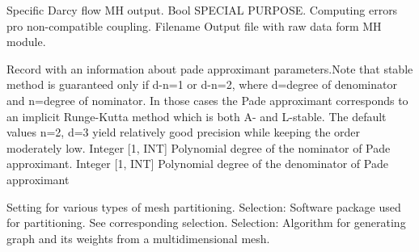 \begin{RecordType}
	{}
	{} %
	{} %
	{} %
	{{{Specific Darcy flow MH output.}}}
		\KeyItem
			{}
			{{Bool}}
			{\textrangle}
			{} %
			{{{SPECIAL PURPOSE. Computing errors pro non-compatible coupling.}}}
		\KeyItem
			{}
			{{Filename}}
			{\textrangle}
			{} %
			{{{Output file with raw data form MH module.}}}
\end{RecordType}
\begin{RecordType}
	{}
	{} %
	{} %
	{} %
	{{{Record with an information about pade approximant parameters.Note that stable method is guaranteed only if d-n=1 or d-n=2, where d=degree of denominator and n=degree of nominator. In those cases the Pade approximant corresponds to an implicit Runge-Kutta method which is both A- and L-stable. The default values n=2, d=3 yield relatively good precision while keeping the order moderately low.}}}
		\KeyItem
			{}
			{{Integer [1, INT]}}
			{\textrangle}
			{} %
			{{{Polynomial degree of the nominator of Pade approximant.}}}
		\KeyItem
			{}
			{{Integer [1, INT]}}
			{\textrangle}
			{} %
			{{{Polynomial degree of the denominator of Pade approximant}}}
\end{RecordType}
\begin{RecordType}
	{}
	{} %
	{} %
	{} %
	{{{Setting for various types of mesh partitioning.}}}
		\KeyItem
			{}
			{{Selection}{: }}
			{\textrangle}
			{} %
			{{{Software package used for partitioning. See corresponding selection.}}}
		\KeyItem
			{}
			{{Selection}{: }}
			{\textrangle}
			{} %
			{{{Algorithm for generating graph and its weights from a multidimensional mesh.}}}
\end{RecordType}
